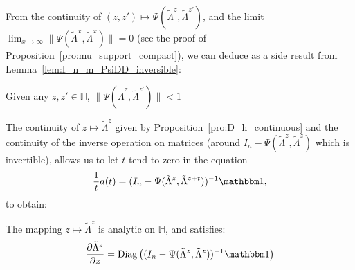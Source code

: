 \documentclass[a4papaer, titlepage]{book}
\begin{document}
From the continuity of $(z,z') \mapsto \Psi(\tilde \Lambda^z, \tilde \Lambda^{z'})$, and the limit $\lim_{x \to \infty} \|\Psi(\tilde \Lambda^x, \tilde \Lambda^{x})\| = 0$ (see the proof of Proposition~\ref{pro:mu_support_compact}), we can deduce as a side result from Lemma~\ref{lem:I_n_m_PsiDD_inversible}:
\begin{lemma}\label{lem:Psi_inf_1}
  Given any $z,z' \in \mathbb H$, $\|\Psi(\tilde \Lambda^z,\tilde \Lambda^{z'})\| <1$
\end{lemma}
The continuity of $z \mapsto \tilde \Lambda^z$ given by Proposition~\ref{pro:D_h_continuous} and the continuity of the inverse operation on matrices (around $I_n - \Psi(\tilde \Lambda^z, \tilde \Lambda^{z})$ which is invertible), allows us to let $t$ tend to zero in the equation
\begin{align*}
  \frac{1}{t}a(t)= (I_n-\Psi(\tilde \Lambda^z, \tilde \Lambda^{z+t}))^{-1} \un,
\end{align*}
to obtain:
\begin{proposition}\label{pro:Lambda_z_analytic}
  The mapping $z\mapsto \tilde \Lambda^z$ is analytic on $\mathbb H$, and satisfies:%
  \begin{align*}
    \frac{\partial \tilde \Lambda^z}{\partial z} = \diag \left((I_n-\Psi(\tilde \Lambda^z, \tilde \Lambda^z))^{-1} \un\right)
  \end{align*}
\end{proposition}
\end{document}
